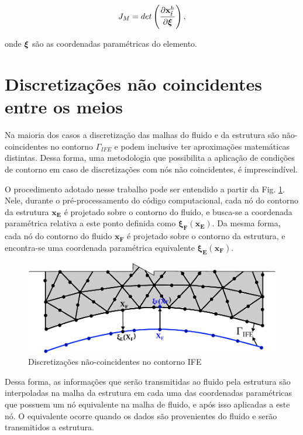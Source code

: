 \documentclass[tese_patricia]{subfiles}
\begin{document}
\begin{align}
	J_M = det\left(\frac{\partial\mathbf{x}^h_{\tilde{t}}}{\partial\boldsymbol{\xi}}\right), 
	\label{eq:3}
\end{align}

\noindent onde $\boldsymbol{\xi}$ são as coordenadas paramétricas do elemento.

\section{Discretizações não coincidentes entre os meios}

Na maioria dos casos a discretização das malhas do fluido e da estrutura são não-coincidentes no contorno $\Gamma_{IFE}$ e podem inclusive ter aproximações matemáticas distintas. Dessa forma, uma metodologia que possibilita a aplicação de condições de contorno em caso de discretizações com nós não coincidentes, é imprescindível. 

O procedimento adotado nesse trabalho pode ser entendido a partir da Fig. \ref{fig:contornoIFE}. Nele, durante o pré-processamento do código computacional, cada nó do contorno da estrutura $\mathbf{x_E}$ é projetado sobre o contorno do fluido, e busca-se a coordenada paramétrica relativa a este ponto definida como $\boldsymbol{\xi_{F}}(\mathbf{x_E})$. Da mesma forma, cada nó do contorno do fluido $\mathbf{x_F}$ é projetado sobre o contorno da estrutura, e encontra-se uma coordenada paramétrica equivalente $\boldsymbol{\xi_{E}}(\mathbf{x_F})$. 


\begin{figure}[htb!]
	\centering 
	\includegraphics[scale=0.9,trim=0cm 0cm 0cm 0cm, clip=true]{Imagens/Cap7/contornoIFE.pdf}	
	\caption{Discretizações não-coincidentes no contorno IFE}
	\label{fig:contornoIFE}
\end{figure}

Dessa forma, as informações que serão transmitidas ao fluido pela estrutura são interpoladas na malha da estrutura em cada uma das coordenadas paramétricas que possuem um nó equivalente na malha de fluido, e após isso aplicadas a este nó. O equivalente ocorre quando os dados são provenientes do fluido e serão transmitidos a estrutura.
\end{document}
